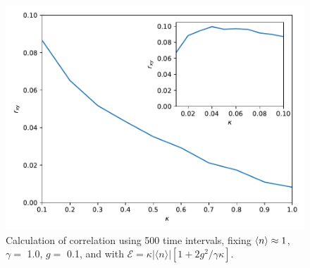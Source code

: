 \documentclass[conference]{IEEEtran}
\begin{document}
\begin{center}
\begin{figure}[t!]
\begin{center}
\includegraphics[scale = 0.45]{cor2.pdf}
\caption{\small{Calculation of correlation using 500 time intervals, fixing $\expval{n} \approx 1$, $\gamma =$ 1.0, $g = $ 0.1, and with  $\mathcal{E} =  \kappa |\langle n \rangle|[1 + 2g^2/\gamma \kappa]$.}} \label{corrxy}
\end{center}  
\end{figure}
\end{center}
\end{document}
